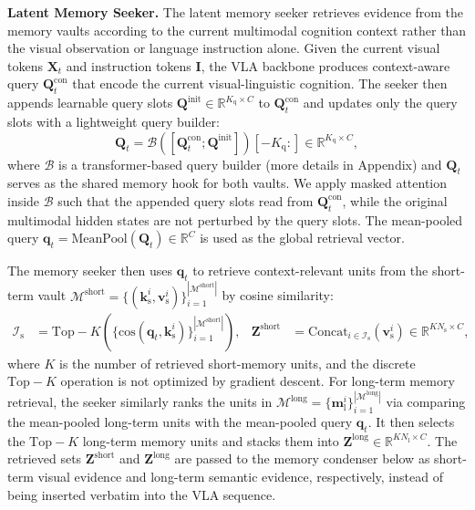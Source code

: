\noindent\textbf{Latent Memory Seeker.}
The latent memory seeker retrieves evidence from the memory vaults according to the current multimodal cognition context rather than the visual observation or language instruction alone.
Given the current visual tokens $\bm{X}_t$ and instruction tokens $\bm{I}$, the VLA backbone produces context-aware query $\bm{Q}_t^\text{con}$ that encode the current visual-linguistic cognition. The seeker then appends learnable query slots $\bm{Q}^\text{init}\in\mathbb{R}^{K_\text{q}\times C}$ to $\bm{Q}_t^\text{con}$ and updates only the query slots with a lightweight query builder:
\begin{equation}
    \label{eq:latent_memory_query}
    \bm{Q}_t = \mathcal{B}([\bm{Q}_t^\text{con}; \bm{Q}^\text{init}])[-K_\text{q}:]
    \in \mathbb{R}^{K_\text{q}\times C},
\end{equation}
where $\mathcal{B}$ is a transformer-based query builder (more details in Appendix) and $\bm{Q}_t$ serves as the shared memory hook for both vaults.
We apply masked attention inside $\mathcal{B}$ such that the appended query slots read from $\bm{Q}_t^\text{con}$, while the original multimodal hidden states are not perturbed by the query slots.
The mean-pooled query
$\bm{q}_t\!=\!\mathrm{MeanPool}(\bm{Q}_t)\in\mathbb{R}^{C}$
is used as the global retrieval vector.

The memory seeker then uses $\bm{q}_t$ to retrieve context-relevant units from the short-term vault $\mathcal{M}^\text{short}=\{(\bm{k}_\text{s}^i,\bm{v}_\text{s}^i)\}_{i=1}^{|\mathcal{M}^\text{short}|}$ by cosine similarity:
\begin{equation}
    \label{eq:short_memory_retrieval}
    \begin{aligned}
        \mathcal{I}_\text{s}
        &= \mathrm{Top\!-\!}K
        \left(\{\mathrm{cos}(\bm{q}_t,\bm{k}_\text{s}^i)\}_{i=1}^{|\mathcal{M}^\text{short}|}\right),
        &
        \bm{Z}^\text{short}
        &= \mathrm{Concat}_{i\in\mathcal{I}_\text{s}}(\bm{v}_\text{s}^i)
        \in \mathbb{R}^{KN_\text{s}\times C},
    \end{aligned}
\end{equation}
where $K$ is the number of retrieved short-memory units, and the discrete $\mathrm{Top\!-\!}K$ operation is not optimized by gradient descent.
For long-term memory retrieval, the seeker similarly ranks the units in $\mathcal{M}^\text{long}=\{\bm{m}_\text{l}^i\}_{i=1}^{|\mathcal{M}^\text{long}|}$ via comparing the mean-pooled long-term units with the mean-pooled query $\bm{q}_t$.
It then selects the $\mathrm{Top\!-\!}K$ long-term memory units and stacks them into $\bm{Z}^\text{long}\in \mathbb{R}^{KN_\text{l}\times C}$.
The retrieved sets $\bm{Z}^\text{short}$ and $\bm{Z}^\text{long}$ are passed to the memory condenser below as short-term visual evidence and long-term semantic evidence, respectively, instead of being inserted verbatim into the VLA sequence.


